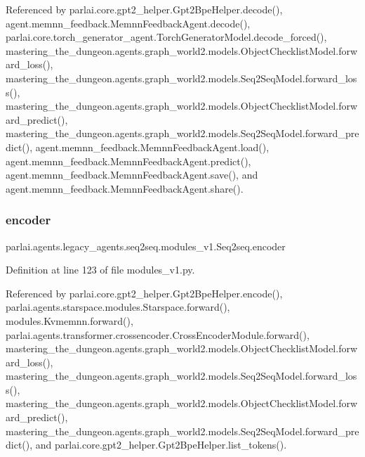 Referenced by parlai.\+core.\+gpt2\+\_\+helper.\+Gpt2\+Bpe\+Helper.\+decode(), agent.\+memnn\+\_\+feedback.\+Memnn\+Feedback\+Agent.\+decode(), parlai.\+core.\+torch\+\_\+generator\+\_\+agent.\+Torch\+Generator\+Model.\+decode\+\_\+forced(), mastering\+\_\+the\+\_\+dungeon.\+agents.\+graph\+\_\+world2.\+models.\+Object\+Checklist\+Model.\+forward\+\_\+loss(), mastering\+\_\+the\+\_\+dungeon.\+agents.\+graph\+\_\+world2.\+models.\+Seq2\+Seq\+Model.\+forward\+\_\+loss(), mastering\+\_\+the\+\_\+dungeon.\+agents.\+graph\+\_\+world2.\+models.\+Object\+Checklist\+Model.\+forward\+\_\+predict(), mastering\+\_\+the\+\_\+dungeon.\+agents.\+graph\+\_\+world2.\+models.\+Seq2\+Seq\+Model.\+forward\+\_\+predict(), agent.\+memnn\+\_\+feedback.\+Memnn\+Feedback\+Agent.\+load(), agent.\+memnn\+\_\+feedback.\+Memnn\+Feedback\+Agent.\+predict(), agent.\+memnn\+\_\+feedback.\+Memnn\+Feedback\+Agent.\+save(), and agent.\+memnn\+\_\+feedback.\+Memnn\+Feedback\+Agent.\+share().

\mbox{\label{classparlai_1_1agents_1_1legacy__agents_1_1seq2seq_1_1modules__v1_1_1Seq2seq_a211aeeea111558aa044329e215450053}} 
\subsubsection{\texorpdfstring{encoder}{encoder}}
{\footnotesize\ttfamily parlai.\+agents.\+legacy\+\_\+agents.\+seq2seq.\+modules\+\_\+v1.\+Seq2seq.\+encoder}



Definition at line 123 of file modules\+\_\+v1.\+py.



Referenced by parlai.\+core.\+gpt2\+\_\+helper.\+Gpt2\+Bpe\+Helper.\+encode(), parlai.\+agents.\+starspace.\+modules.\+Starspace.\+forward(), modules.\+Kvmemnn.\+forward(), parlai.\+agents.\+transformer.\+crossencoder.\+Cross\+Encoder\+Module.\+forward(), mastering\+\_\+the\+\_\+dungeon.\+agents.\+graph\+\_\+world2.\+models.\+Object\+Checklist\+Model.\+forward\+\_\+loss(), mastering\+\_\+the\+\_\+dungeon.\+agents.\+graph\+\_\+world2.\+models.\+Seq2\+Seq\+Model.\+forward\+\_\+loss(), mastering\+\_\+the\+\_\+dungeon.\+agents.\+graph\+\_\+world2.\+models.\+Object\+Checklist\+Model.\+forward\+\_\+predict(), mastering\+\_\+the\+\_\+dungeon.\+agents.\+graph\+\_\+world2.\+models.\+Seq2\+Seq\+Model.\+forward\+\_\+predict(), and parlai.\+core.\+gpt2\+\_\+helper.\+Gpt2\+Bpe\+Helper.\+list\+\_\+tokens().

